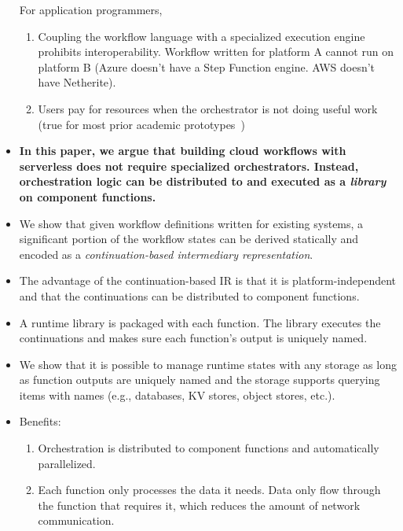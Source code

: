 \begin{itemize}
  For application programmers,

  \begin{enumerate}
    \item Coupling the workflow language with a specialized execution engine
    prohibits interoperability. Workflow written for platform A cannot run on
    platform B (Azure doesn't have a Step Function engine. AWS doesn't have
    Netherite).

    \item Users pay for resources when the orchestrator is not doing useful
    work (true for most prior academic prototypes~\cite{gg-atc, excamera,
    kappa, triggerflow, pywren})
  \end{enumerate}


  \item \textbf{In this paper, we argue that building cloud workflows with serverless
does not require specialized orchestrators. Instead, orchestration logic can
be distributed to and executed as a \emph{library} on component functions.}

  \item We show that given workflow definitions written for existing systems,
  a significant portion of the workflow states can be derived statically and
  encoded as a \emph{continuation-based intermediary representation}.

  \item The advantage of the continuation-based IR is that it is
  platform-independent and that the continuations can be distributed to
  component functions.

  \item A runtime library is packaged with each function. The library executes
  the continuations and makes sure each function's output is uniquely named.

  \item We show that it is possible to manage runtime states with any storage
  as long as function outputs are uniquely named and the storage supports
  querying items with names (e.g., databases, KV stores, object stores, etc.).

  \item Benefits:

    \begin{enumerate}

      \item Orchestration is distributed to component functions and
      automatically parallelized.

      \item Each function only processes the data it needs. Data only flow
      through the function that requires it, which reduces the amount of
      network communication.


\end{enumerate}
\end{itemize}
